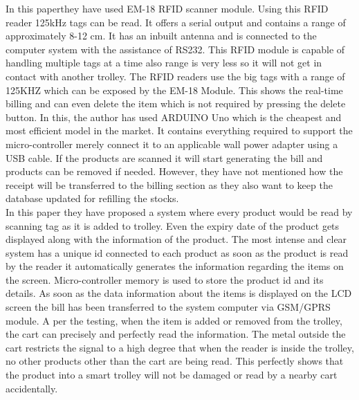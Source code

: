 \documentclass[conference]{IEEEtran}
\begin{document}
In this paper\cite{b11}they have used EM-18 RFID scanner module. Using this RFID reader 125kHz tags can be read. It offers a serial output and contains a range of approximately 8-12 cm. It has an inbuilt antenna and is connected to the computer system with the assistance of RS232. This RFID module is capable of handling multiple tags at a time also range is very less so it will not get in contact with another trolley. The RFID readers use the big tags with a range of 125KHZ which can be exposed by the EM-18 Module. This shows the real-time billing and can even delete the item which is not required by pressing the delete button. In this, the author has used ARDUINO Uno which is the cheapest and most efficient model in the market. It contains everything required to support the micro-controller merely connect it to an applicable wall power adapter using a USB cable. If the products are scanned it will start generating the bill and products can be removed if needed. However, they have not mentioned how the receipt will be transferred to the billing section as they also want to keep the database updated for refilling the stocks.\\

In this paper\cite{b12} they have proposed a system where every product would be read by scanning tag as it is added to trolley. Even the expiry date of the product gets displayed along with the information of the product. The most intense and clear system has a unique id connected to each product as soon as the product is read by the reader it automatically generates the information regarding the items on the screen. Micro-controller memory is used to store the product id and its details. As soon as the data information about the items is displayed on the LCD screen the bill has been transferred to the system computer via GSM/GPRS module.  A per the testing, when the item is added or removed from the trolley, the cart can precisely and perfectly read the information. The metal outside the cart restricts the signal to a high degree that when the reader is inside the trolley, no other products other than the cart are being read. This perfectly shows that the product into a smart trolley will not be damaged or read by a nearby cart accidentally.\\
\end{document}
